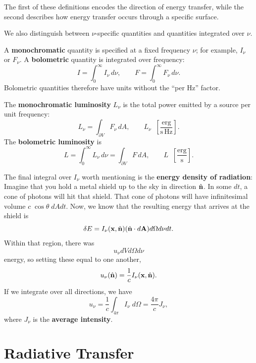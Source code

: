 The first of these definitions encodes the direction of energy transfer, while the second describes how energy transfer occurs through a specific surface.
\par
We also distinguish between $\nu$-specific quantities and quantities integrated over $\nu$.
\vspace{0.25cm}
\begin{definition}
A \textbf{monochromatic} quantity is specified at a fixed frequency
$\nu$; for example, $I_\nu$ or $F_\nu$.  
A \textbf{bolometric} quantity is integrated over frequency:
\[
    I = \int_0^\infty I_\nu \, d\nu,
    \qquad
    F = \int_0^\infty F_\nu \, d\nu.
\]
Bolometric quantities therefore have units without the ``per Hz'' factor.
\end{definition}

\begin{definition}[Luminosity]
The \textbf{monochromatic luminosity} $L_\nu$ is the total power emitted
by a source per unit frequency:
\[
    L_\nu = \int_{\partial V} F_\nu \, dA,
    \qquad
    L_\nu \;\; \left[ \frac{\mathrm{erg}}
                          {\mathrm{s}\,\mathrm{Hz}} \right].
\]
The \textbf{bolometric luminosity} is
\[
    L = \int_0^\infty L_\nu \, d\nu
      = \int_{\partial V} F \, dA,
    \qquad
    L \;\; \left[ \frac{\mathrm{erg}}{\mathrm{s}} \right].
\]
\end{definition}
\par
The final integral over $I_\nu$ worth mentioning is the \textbf{energy density of radiation}:
Imagine that you hold a metal shield up to the sky in direction $\hat{\bf n}$. In some $dt$, a cone of photons will hit that shield. That cone of photons will have infinitesimal volume $c \; \cos \theta \;dAdt$.  Now, we know that the resulting energy that arrives at the shield is
\[
\delta E = I_\nu({\bf x},\hat{\bf n}) (\hat{\bf n} \cdot d{\bf A}) d\Omega d\nu dt.
\]
Within that region, there was
\[
u_\nu dV d\Omega d\nu
\]
energy, so setting these equal to one another,
\[
u_\nu(\hat{\bf n}) = \frac{1}{c} I_\nu({\bf x},\hat{\bf n}).
\]
If we integrate over all directions, we have
\begin{equation}
    \boxed{
    u_\nu = \frac{1}{c}\int_{4 \pi} I_\nu \;d\Omega = \frac{4\pi}{c} J_\nu,
    }
\end{equation}
where $J_\nu$ is the \textbf{average intensity}.


\section{Radiative Transfer}

